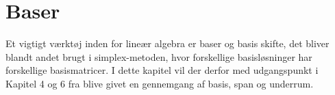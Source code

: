 \chapter{Baser}
Et vigtigt værktøj inden for lineær algebra er baser og basis skifte, det bliver blandt andet brugt i simplex-metoden, hvor forskellige basisløsninger har forskellige basismatricer. 
I dette kapitel vil der derfor med udgangspunkt i Kapitel 4 og 6 fra \cite{lial}
blive givet en gennemgang af basis, span og underrum. \\





